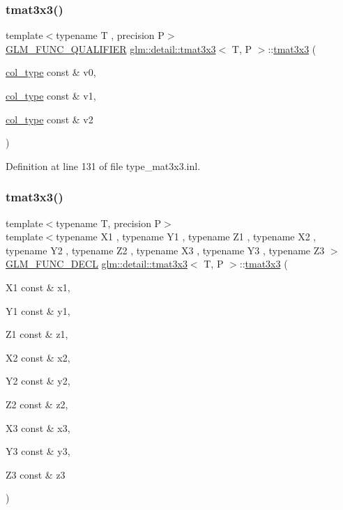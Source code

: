 \subsubsection{\texorpdfstring{tmat3x3()}{tmat3x3()}\hspace{0.1cm}{\footnotesize\ttfamily [7/22]}}
{\footnotesize\ttfamily template$<$typename T , precision P$>$ \\
\hyperlink{setup_8hpp_a33fdea6f91c5f834105f7415e2a64407}{G\+L\+M\+\_\+\+F\+U\+N\+C\+\_\+\+Q\+U\+A\+L\+I\+F\+I\+ER} \hyperlink{structglm_1_1detail_1_1tmat3x3}{glm\+::detail\+::tmat3x3}$<$ T, P $>$\+::\hyperlink{structglm_1_1detail_1_1tmat3x3}{tmat3x3} (\begin{DoxyParamCaption}\item[{\hyperlink{structglm_1_1detail_1_1tmat3x3_ad47f3a11bd4333d1103bfa93a86fa54f}{col\+\_\+type} const \&}]{v0,  }\item[{\hyperlink{structglm_1_1detail_1_1tmat3x3_ad47f3a11bd4333d1103bfa93a86fa54f}{col\+\_\+type} const \&}]{v1,  }\item[{\hyperlink{structglm_1_1detail_1_1tmat3x3_ad47f3a11bd4333d1103bfa93a86fa54f}{col\+\_\+type} const \&}]{v2 }\end{DoxyParamCaption})}



Definition at line 131 of file type\+\_\+mat3x3.\+inl.

\mbox{\label{structglm_1_1detail_1_1tmat3x3_a9231c5d0ebe3a535d602e4135b9019c2}} 
\subsubsection{\texorpdfstring{tmat3x3()}{tmat3x3()}\hspace{0.1cm}{\footnotesize\ttfamily [8/22]}}
{\footnotesize\ttfamily template$<$typename T, precision P$>$ \\
template$<$typename X1 , typename Y1 , typename Z1 , typename X2 , typename Y2 , typename Z2 , typename X3 , typename Y3 , typename Z3 $>$ \\
\hyperlink{setup_8hpp_ab2d052de21a70539923e9bcbf6e83a51}{G\+L\+M\+\_\+\+F\+U\+N\+C\+\_\+\+D\+E\+CL} \hyperlink{structglm_1_1detail_1_1tmat3x3}{glm\+::detail\+::tmat3x3}$<$ T, P $>$\+::\hyperlink{structglm_1_1detail_1_1tmat3x3}{tmat3x3} (\begin{DoxyParamCaption}\item[{X1 const \&}]{x1,  }\item[{Y1 const \&}]{y1,  }\item[{Z1 const \&}]{z1,  }\item[{X2 const \&}]{x2,  }\item[{Y2 const \&}]{y2,  }\item[{Z2 const \&}]{z2,  }\item[{X3 const \&}]{x3,  }\item[{Y3 const \&}]{y3,  }\item[{Z3 const \&}]{z3 }\end{DoxyParamCaption})}

